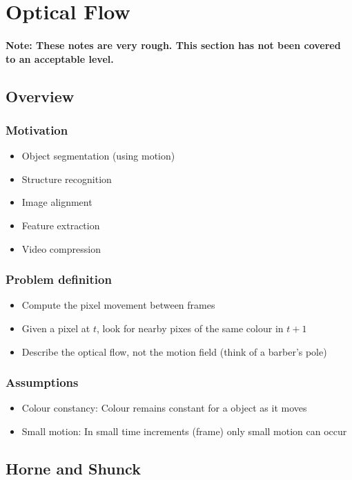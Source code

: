 \documentclass[]{article}
\begin{document}
\section{Optical Flow}
	\paragraph{Note: These notes are very rough. This section has not been covered to an acceptable level.}
	\subsection{Overview}
		\subsubsection{Motivation}
		\begin{itemize}
			\item Object segmentation (using motion)
			\item Structure recognition
			\item Image alignment
			\item Feature extraction
			\item Video compression
		\end{itemize}
		\subsubsection{Problem definition}
		\begin{itemize}
			\item Compute the pixel movement between frames
			\item Given a pixel at $t$, look for nearby pixes of the same colour in $t+1$
			\item Describe the optical flow, not the motion field (think of a barber's pole)
		\end{itemize}
		\subsubsection{Assumptions}
		\begin{itemize}
			\item Colour constancy: Colour remains constant for a object as it moves
			\item Small motion: In small time increments (frame) only small motion can occur
		\end{itemize}
	\subsection{Horne and Shunck}
\end{document}

